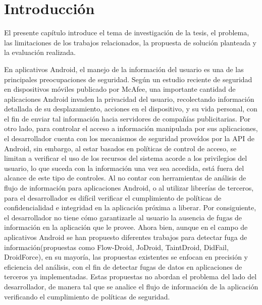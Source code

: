 \chapter{Introducción}
\label{ch:introduccion}
El presente capítulo introduce el tema de investigación de la tesis, el
problema, las limitaciones de los trabajos relacionados,  la propuesta de
solución planteada y la evaluación realizada.\newline

En aplicativos Android, el manejo de la información del usuario es una de las
principales preocupaciones de seguridad. Según un estudio reciente de seguridad
en dispositivos móviles publicado por McAfee\cite{McAfeeReport}, una importante
cantidad de aplicaciones Android invaden la privacidad del usuario, recolectando
información detallada de su desplazamiento, acciones en el dispositivo, y su
vida personal, con el fin de enviar tal información hacia servidores de
compañías publicitarias.\newline 
Por otro lado, para controlar el acceso a información manipulada por sus
aplicaciones, el desarrollador cuenta con los mecanismos de seguridad proveídos
por la API de Android, sin embargo, al estar basados en políticas de control de
acceso, se limitan a verificar el uso de los recursos del sistema acorde a los
privilegios del usuario, lo que suceda con la información una vez sea accedida,
está fuera del alcance de este tipo de controles.\newline 
Al no contar con herramientas de análisis de flujo de información para
aplicaciones Android, o al utilizar librerías de terceros, para el desarrollador
es difícil verificar el cumplimiento de políticas de confidencialidad e
integridad en la aplicación próxima a liberar. Por consiguiente, el
desarrollador no tiene cómo garantizarle al usuario la ausencia de fugas de
información en la aplicación que le provee.\newline 
Ahora bien, aunque en el campo de aplicativos Android se han propuesto
diferentes trabajos para detectar fuga de información(propuestas como
Flow-Droid\cite{FlowDroid-Thesis}, JoDroid\cite{JoDroid-Paper},
TaintDroid\cite{TaintDroid}, DidFail\cite{DidFail},
DroidForce\cite{DroidForce}), en su mayoría, las propuestas existentes se
enfocan en precisión y eficiencia del análisis, con el fin de detectar
fugas de datos en aplicaciones de terceros ya implementadas.
Estas propuestas no abordan el problema del lado del desarrollador, de
manera tal que se analice el flujo de información de la aplicación verificando
el cumplimiento de políticas de seguridad.\newline 
